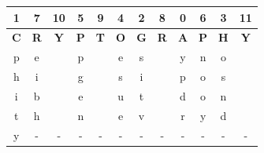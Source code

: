 \documentclass{ashoka-crypto}
\begin{document}
\begin{center}
\begin{tabular}{|c|c|c|c|c|c|c|c|c|c|c|c|}
\hline
1          & 7          & 10         & 5          & 9          & 4          & 2          & 8          & 0          & 6          & 3          & 11         \\ \hline
\textbf{C} & \textbf{R} & \textbf{Y} & \textbf{P} & \textbf{T} & \textbf{O} & \textbf{G} & \textbf{R} & \textbf{A} & \textbf{P} & \textbf{H} & \textbf{Y} \\ \hline
p          & e          &            & p          &            & e          & s          &            & y          & n          & o          &            \\ \hline
h          & i          &            & g          &            & s          & i          &            & p          & o          & s          &            \\ \hline
i          & b          &            & e          &            & u          & t          &            & d          & o          & n          &            \\ \hline
t          & h          &            & n          &            & e          & v          &            & r          & y          & d          &            \\ \hline
y          &     -       &    -        &      -     &     -       &      -      &     -       &     -       &      -      &     -       &       -     &  -            \\ \hline
\end{tabular}
\end{center}
\end{document}
